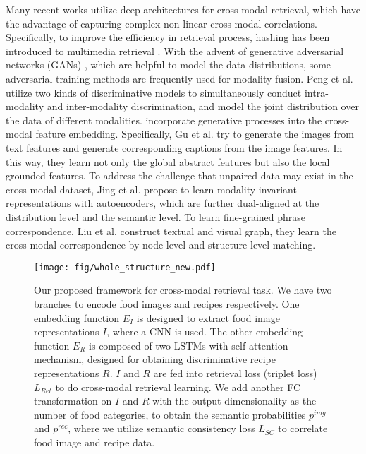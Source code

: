 \documentclass[journal]{IEEEtran}
\begin{document}
Many recent works \cite{li2018deep,li2020weakly,jin2020deep} utilize deep architectures for cross-modal retrieval, which have the advantage of capturing complex non-linear cross-modal correlations. Specifically, to improve the efficiency in retrieval process, hashing has been introduced to multimedia retrieval \cite{li2020weakly,jin2020deep}. With the advent of generative adversarial networks (GANs) \cite{goodfellow2014generative}, which are helpful to model the data distributions, some adversarial training methods \cite{gu2017look, peng2017cm, ghasedi2018unsupervised} are frequently used for modality fusion. Peng et al. \cite{peng2017cm} utilize two kinds of discriminative models to simultaneously conduct intra-modality and inter-modality discrimination, and model the joint distribution over the data of different modalities. \cite{gu2017look,jing2020incomplete} incorporate generative processes into the cross-modal feature embedding. Specifically, Gu et al. \cite{gu2017look} try to generate the images from text features and generate corresponding captions from the image features. In this way, they learn not only the global abstract features but also the local grounded features. To address the challenge that unpaired data may exist in the cross-modal dataset, Jing et al. \cite{jing2020incomplete} propose to learn modality-invariant representations with autoencoders, which are further dual-aligned at the distribution level and the semantic level. To learn fine-grained phrase correspondence, Liu et al. \cite{liu2020graph} construct textual and visual graph, they learn the cross-modal correspondence by node-level and structure-level matching.

\begin{figure*}[htb]
\begin{center}
\texttt{[image: fig/whole\_structure\_new.pdf]}
\end{center}
   \caption{Our proposed framework for cross-modal retrieval task. We have two branches to encode food images and recipes respectively. One embedding function $E_I$ is designed to extract food image representations $I$, where a CNN is used. The other embedding function $E_R$ is composed of two LSTMs with self-attention mechanism, designed for obtaining discriminative recipe representations $R$. $I$ and $R$ are fed into retrieval loss (triplet loss) $L_{Ret}$ to do cross-modal retrieval learning. We add another FC transformation on $I$ and $R$ with the output dimensionality as the number of food categories, to obtain the semantic probabilities $p^{img}$ and $p^{rec}$, where we utilize semantic consistency loss $L_{SC}$ to correlate food image and recipe data.}
\label{fig:pipeline}
\end{figure*}
\end{document}
